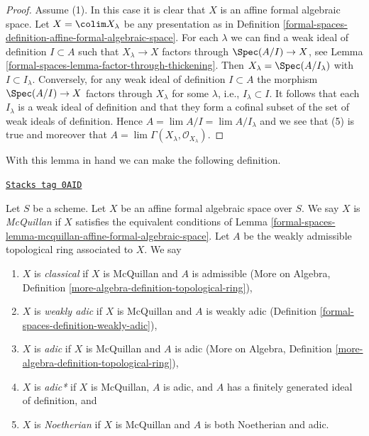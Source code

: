 \begin{proof}
\medskip\noindent
Assume (1). In this case it is clear that $X$ is an affine formal
algebraic space. Let $X = \colim X_\lambda$ be any presentation as in
Definition \ref{formal-spaces-definition-affine-formal-algebraic-space}.
For each $\lambda$ we can find a weak ideal of definition
$I \subset A$ such that $X_\lambda \to X$ factors through
$\Spec(A/I) \to X$, see Lemma \ref{formal-spaces-lemma-factor-through-thickening}.
Then $X_\lambda = \Spec(A/I_\lambda)$ with $I \subset I_\lambda$.
Conversely, for any weak ideal of definition $I \subset A$
the morphism $\Spec(A/I) \to X$ factors through $X_\lambda$
for some $\lambda$, i.e., $I_\lambda \subset I$.
It follows that each $I_\lambda$ is a weak ideal of definition
and that they form a cofinal subset of the set of weak ideals
of definition. Hence $A = \lim A/I = \lim A/I_\lambda$
and we see that (5) is true and moreover that
$A = \lim \Gamma(X_\lambda, \mathcal{O}_{X_\lambda})$.
\end{proof}

With this lemma in hand we can make the following definition.

\begin{definition}
\label{formal-spaces-definition-types-affine-formal-algebraic-space}
\href{https://stacks.math.columbia.edu/tag/0AID}{\texttt{Stacks tag 0AID}}

Let $S$ be a scheme. Let $X$ be an affine formal algebraic space over $S$.
We say $X$ is {\it McQuillan} if $X$ satisfies the equivalent conditions
of Lemma \ref{formal-spaces-lemma-mcquillan-affine-formal-algebraic-space}. Let $A$
be the weakly admissible topological ring associated to $X$. We say
\begin{enumerate}
\item $X$ is {\it classical} if $X$ is McQuillan and $A$ is admissible
(More on Algebra, Definition \ref{more-algebra-definition-topological-ring}),
\item $X$ is {\it weakly adic} if $X$ is McQuillan and $A$ is weakly adic
(Definition \ref{formal-spaces-definition-weakly-adic}),
\item $X$ is {\it adic} if $X$ is McQuillan and $A$ is adic
(More on Algebra, Definition \ref{more-algebra-definition-topological-ring}),
\item $X$ is {\it adic*} if $X$ is McQuillan, $A$ is adic, and $A$
has a finitely generated ideal of definition, and
\item $X$ is {\it Noetherian} if $X$ is McQuillan and $A$ is
both Noetherian and adic.
\end{enumerate}
\end{definition}


